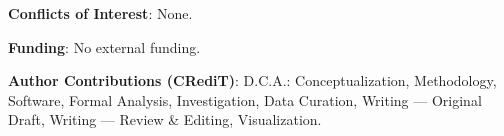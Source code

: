 \documentclass[12pt]{article}
\begin{document}
\medskip\noindent
\textbf{Conflicts of Interest}: None.

\medskip\noindent
\textbf{Funding}: No external funding.

\medskip\noindent
\textbf{Author Contributions (CRediT)}: D.C.A.: Conceptualization, Methodology, Software,
Formal Analysis, Investigation, Data Curation, Writing --- Original Draft, Writing ---
Review \& Editing, Visualization.
\end{document}

